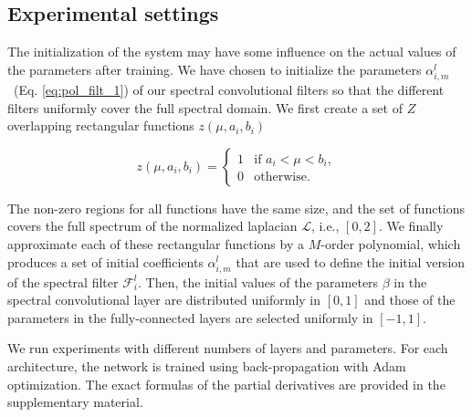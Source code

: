 \documentclass[10pt,journal,compsoc]{IEEEtran}
\begin{document}
	\subsection{Experimental settings}
	\label{s:init}

	The initialization of the system may have some influence on the actual values of the parameters after training. We have chosen to initialize the parameters $\alpha_{i,m}^l$~(Eq. \ref{eq:pol_filt_1}) of our spectral convolutional filters so that the different filters uniformly cover the full spectral domain. We first create a set of $Z$ overlapping rectangular functions $z(\mu, a_i, b_i)$

	\begin{equation}
	z(\mu, a_i, b_i) =
	\begin{cases}
	1 & \mbox{if } a_i < \mu < b_i, \\
	0 & \mbox{otherwise.}
	\end{cases}
	\end{equation}

	The non-zero regions for all functions have the same size, and the set of functions covers the full spectrum of the normalized laplacian $\mathcal{L}$, i.e., $[0, 2]$. We finally approximate each of these rectangular functions by a $M$-order polynomial, which produces a set of initial coefficients $\alpha_{i,m}^l$ that are used to define the initial version of the spectral filter $\mathcal{F}_i^{l}$. Then, the initial values of the parameters $\beta$ in the spectral convolutional layer are distributed uniformly in $[0, 1]$ and those of the parameters in the fully-connected layers are selected uniformly in $[-1, 1]$.

	We run experiments with different numbers of layers and parameters. For each architecture, the network is trained using back-propagation with Adam~\cite{bb:adam} optimization. The exact formulas of the partial derivatives are provided in the supplementary material.
\end{document}
